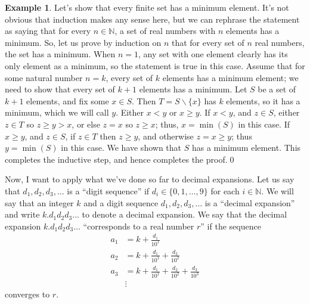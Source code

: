 \documentclass[12pt]{amsart}
\newcommand{\N}{\mathbb{N}}
\numberwithin{equation}{section}
\theoremstyle{plain} %
\theoremstyle{definition}
\newtheorem{ex}[equation]{Example}
\theoremstyle{remark}
\begin{document}
\begin{ex} Let's show that every finite set has a minimum element. It's not obvious that induction makes any sense here, but we can rephrase the statement as saying that for every $n\in \N$, a set of real numbers with $n$ elements has a minimum. So, let us prove by induction on $n$ that for every set of $n$ real numbers, the set has a minimum.
 When $n=1$, any set with one element clearly has its only element as a minimum, so the statement is true in this case.
Assume that for some natural number $n=k$, every set of $k$ elements has a minimum element; we need to show that every set of $k+1$ elements has a minimum. Let $S$ be a set of $k+1$ elements, and fix some $x\in S$. Then $T=S\smallsetminus\{x\}$ has $k$ elements, so it has a minimum, which we will call $y$. Either $x<y$ or $x\geq y$. If $x<y$, and $z\in S$, either $z \in T$ so $z\geq y > x$, or else $z=x$ so $z\geq x$; thus, $x=\min (S)$ in this case. If $x\geq y$, and $z\in S$, if $z\in T$ then $z\geq y$, and otherwise $z=x\geq y$; thus $y=\min (S)$ in this case. We have shown that $S$ has a minimum element. This completes the inductive step, and hence completes the proof.\qed
\end{ex}

Now, I want to apply what we've done so far to decimal expansions. Let us say that $d_1,d_2,d_3,\dots$ is a ``digit sequence'' if $d_i\in\{0,1,\dots,9\}$ for each $i\in\N$. We will say that an integer $k$ and a digit sequence $d_1,d_2,d_3,\dots$ is a ``decimal expansion'' and write $k. d_1 d_2 d_3 \dots$ to denote a decimal expansion. We say that the decimal expansion $k. d_1 d_2 d_3 \dots$  ``corresponds to a real number $r$'' if the sequence
\begin{align*}
a_1 &= k + \frac{d_1}{10^1} \\
a_2 &= k + \frac{d_1}{10^1} + \frac{d_2}{10^2} \\
a_3 &= k + \frac{d_1}{10^1} + \frac{d_2}{10^2} + \frac{d_3}{10^3}\\
&\vdots
\end{align*}
converges to $r$.
\end{document}
